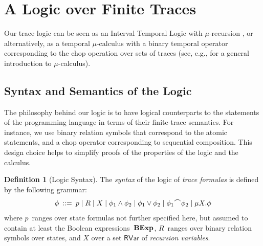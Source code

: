 \documentclass[10pt,a4paper]{amsart}
\theoremstyle{definition}
\newtheorem{definition}[theorem]{Definition}
\newcommand{\rh}[1]{\marginpar{RH: #1}}
\newcommand{\chop}[0]{\raisebox{1ex}{$\frown$}}
\newcommand{\BExp}{\mbox{\bf BExp}}
\begin{document}
\section{A Logic over Finite Traces}
\label{sec:logic-traces}

Our trace logic can be seen as an Interval Temporal Logic
\cite{HalpernShoham91} with $\mu$-recursion \cite{Park76}, or
alternatively, as a temporal $\mu$-calculus with a binary temporal
operator corresponding to the chop operation over sets of traces (see,
e.g., \cite{sti-93-handbook-chapter} for a general introduction to
$\mu$-calculus).


\subsection{Syntax and Semantics of the Logic}

The philosophy behind our logic is to have logical counterparts to 
the statements of the programming language in terms of their 
finite-trace semantics. 
%
For instance, we use binary relation symbols that correspond to the
atomic statements, and a chop operator corresponding to sequential 
composition.
%
This design choice helps to simplify proofs of the properties of the
logic and the calculus.

\begin{definition}[Logic Syntax]
\label{def:logic-syntax}
The \emph{syntax} of the logic of \emph{trace formulas} is defined by
the following grammar:
%
$$ \phi \>::=\> p \mid
                R \mid 
                X \mid 
                \phi_1 \wedge \phi_2 \mid 
                \phi_1 \vee \phi_2 \mid 
                \phi_1 \chop \phi_2 \mid 
                \mu X. \phi
$$
%
where $p$~ranges over state formulas not further specified here, but
assumed to contain at least the Boolean expressions~$\BExp$,
$R$~ranges over binary relation symbols over states, and $X$ over a
set $\mathsf{RVar}$ of \emph{recursion variables}.
\end{definition}
\end{document}
